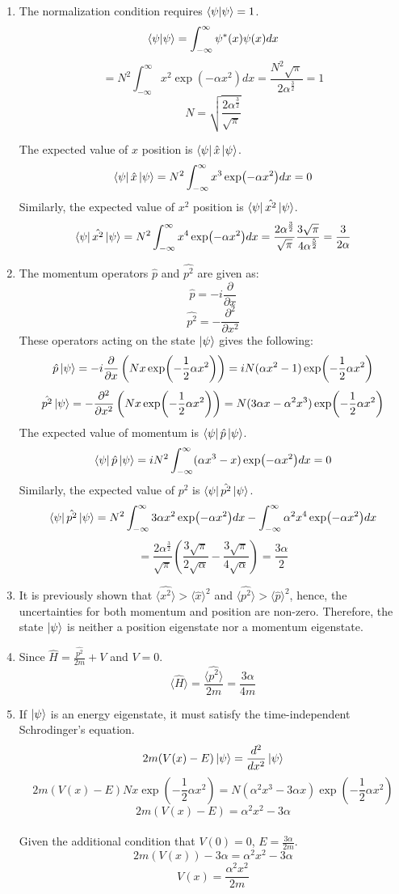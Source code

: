 \begin{sol}
\begin{enumerate}[label=\textbf{(\alph*)}]
	\item The normalization condition requires $\braket{\psi}{\psi}=1$.
	$$\braket{\psi}{\psi}=\int_{-\infty}^{\infty}\psi^*(x)\psi(x) dx$$
	$$=N^2\int_{-\infty}^{\infty}x^2\exp(-\alpha x^2)dx=\frac{N^2\sqrt\pi}{2\alpha^\frac{3}{2}}=1$$
	$$N=\sqrt{\frac{2\alpha^\frac{3}{2}}{\sqrt{\pi}}}$$
	
	The expected value of $x$ position is $\bra{\psi}\hat{x}\ket{\psi}$.
	$$\bra{\psi}\hat{x}\ket{\psi}=N^2\int_{-\infty}^{\infty}x^3\exp(-\alpha x^2)dx=0$$
	Similarly, the expected value of $x^2$ position is $\bra{\psi}\hat{x^2}\ket{\psi}$.
	$$\bra{\psi}\hat{x^2}\ket{\psi}=N^2\int_{-\infty}^{\infty}x^4\exp(-\alpha x^2)dx
	=\frac{2\alpha^\frac{3}{2}}{\sqrt{\pi}}\frac{3\sqrt{\pi}}{4\alpha^\frac{5}{2}}=\frac{3}{2\alpha}$$
	
	\item The momentum operators $\hat{p}$ and $\hat{p^2}$ are given as:
	$$\hat{p}=-i\frac{\partial}{\partial x}$$
	$$\hat{p^2}=-\frac{\partial^2}{\partial x^2}$$
	These operators acting on the state $\ket{\psi}$ gives the following:
	$$\hat{p}\ket{\psi}=-i\frac{\partial}{\partial x}\left(Nx\exp(-\frac{1}{2}\alpha x^2)\right)=
	iN(\alpha x^2-1)\exp(-\frac{1}{2}\alpha x^2)$$
	$$\hat{p^2}\ket{\psi}=-\frac{\partial^2}{\partial x^2}\left(Nx\exp(-\frac{1}{2}\alpha x^2)\right)=
	N(3\alpha x - \alpha^2x^3)\exp(-\frac{1}{2}\alpha x^2)$$
	The expected value of momentum is $\bra{\psi}\hat{p}\ket{\psi}$.
	$$\bra{\psi}\hat{p}\ket{\psi}=iN^2\int_{-\infty}^{\infty}(\alpha x^3-x)\exp(-\alpha x^2)dx=0$$
	Similarly, the expected value of $p^2$ is $\bra{\psi}\hat{p^2}\ket{\psi}$.
	$$\bra{\psi}\hat{p^2}\ket{\psi}=N^2\int_{-\infty}^{\infty}3\alpha x^2 \exp(-\alpha x^2)dx-
	\int_{-\infty}^{\infty}\alpha^2 x^4 \exp(-\alpha x^2)dx$$
	$$=\frac{2\alpha^\frac{3}{2}}{\sqrt{\pi}}
	\left(\frac{3\sqrt\pi}{2\sqrt\alpha}-\frac{3\sqrt{\pi}}{4\sqrt{\alpha}}\right)
	=\frac{3\alpha}{2}$$
	
	\item It is previously shown that $\langle \hat{x^2} \rangle > \langle \hat{x}\rangle^2$ and $\langle \hat{p^2} \rangle > \langle \hat{p}\rangle^2$, hence, the uncertainties for both momentum and position are non-zero. Therefore, the state $\ket{\psi}$ is neither a position eigenstate nor a momentum eigenstate.
	\item Since $\hat{H}=\frac{\hat{p^2}}{2m}+V$ and $V=0$. 
	$$\langle\hat{H}\rangle=\frac{\langle\hat{p^2}\rangle}{2m}=\frac{3\alpha}{4m}$$
	\item If $\ket{\psi}$ is an energy eigenstate, it must satisfy the time-independent Schrodinger's equation.
	$$2m(V(x)-E)\ket\psi=\frac{d^2}{dx^2}\ket\psi$$
	$$2m(V(x)-E)Nx\exp(-\frac{1}{2}\alpha x^2)=N(\alpha^2x^3-3\alpha x)\exp(-\frac{1}{2}\alpha x^2)$$
	$$2m(V(x)-E)=\alpha^2x^2-3\alpha$$
	\\
	Given the additional condition that $V(0)=0$, $E=\displaystyle{\frac{3\alpha}{2m}}$.
	\\
	$$2m(V(x))-3\alpha=\alpha^2x^2-3\alpha$$
	$$V(x)=\frac{\alpha^2x^2}{2m}$$
	

\end{enumerate}
\end{sol}
